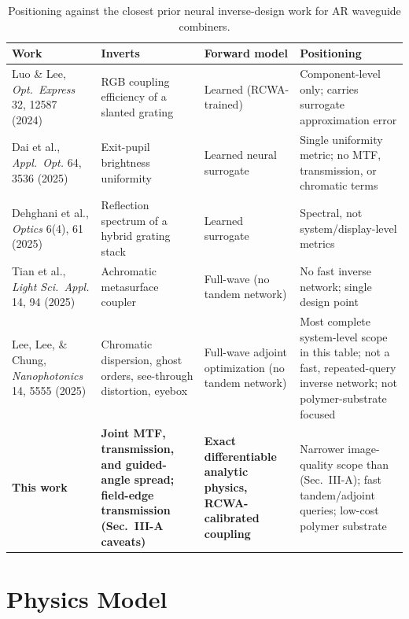 \documentclass[10pt,twocolumn]{article}
\begin{document}
\begin{table}[t]
\centering
\caption{Positioning against the closest prior neural inverse-design work for AR waveguide combiners.}
\label{tab:related}
\footnotesize
\begin{tabular}{p{2.9cm}p{2.7cm}p{2.7cm}p{7.0cm}}
\toprule
\textbf{Work} & \textbf{Inverts} & \textbf{Forward model} & \textbf{Positioning} \\
\midrule
Luo \& Lee, \emph{Opt.\ Express} 32, 12587 (2024) \cite{luo2024} & RGB coupling efficiency of a slanted grating & Learned (RCWA-trained) & Component-level only; carries surrogate approximation error \\
Dai et al., \emph{Appl.\ Opt.} 64, 3536 (2025) \cite{dai2025} & Exit-pupil brightness uniformity & Learned neural surrogate & Single uniformity metric; no MTF, transmission, or chromatic terms \\
Dehghani et al., \emph{Optics} 6(4), 61 (2025) \cite{dehghani2025} & Reflection spectrum of a hybrid grating stack & Learned surrogate & Spectral, not system/display-level metrics \\
Tian et al., \emph{Light Sci.\ Appl.} 14, 94 (2025) \cite{tian2025} & Achromatic metasurface coupler & Full-wave (no tandem network) & No fast inverse network; single design point \\
Lee, Lee, \& Chung, \emph{Nanophotonics} 14, 5555 (2025) \cite{lee2025nanophotonics} & Chromatic dispersion, ghost orders, see-through distortion, eyebox & Full-wave adjoint optimization (no tandem network) & Most complete system-level scope in this table; not a fast, repeated-query inverse network; not polymer-substrate focused \\
\textbf{This work} & \textbf{Joint MTF, transmission, and guided-angle spread; field-edge transmission (Sec.~III-A caveats)} & \textbf{Exact differentiable analytic physics, RCWA-calibrated coupling} & Narrower image-quality scope than \cite{lee2025nanophotonics} (Sec.~III-A); fast tandem/adjoint queries; low-cost polymer substrate \\
\bottomrule
\end{tabular}
\end{table}

\section{Physics Model}
\end{document}
